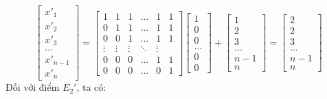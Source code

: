 \documentclass[12pt,a4paper]{article}
\begin{document}
\[
\begin{bmatrix}
    x'_1 \\ x'_2 \\ x'_3 \\ ... \\ x'_{n-1} \\ x'_n
\end{bmatrix} = \begin{bmatrix}
1 & 1 & 1 & \dots & 1 & 1 \\
0 & 1 & 1 & \dots & 1 & 1 \\
0 & 0 & 1 & \dots & 1 & 1 \\
\vdots & \vdots & \vdots & \ddots & \vdots \\
0 & 0 & 0 & \dots & 1 & 1 \\
0 & 0 & 0 & \dots & 0 & 1
\end{bmatrix} \begin{bmatrix}
    1 \\ 0 \\ 0 \\ \dots \\ 0 \\ 0
\end{bmatrix} + \begin{bmatrix}
    1 \\ 2 \\ 3 \\ ... \\ n-1 \\ n
\end{bmatrix} = \begin{bmatrix}
    2 \\ 2 \\ 3 \\ \dots \\ n-1 \\ n
\end{bmatrix}
\]
Đối với điểm \(E_2'\), ta có: 
\end{document}
